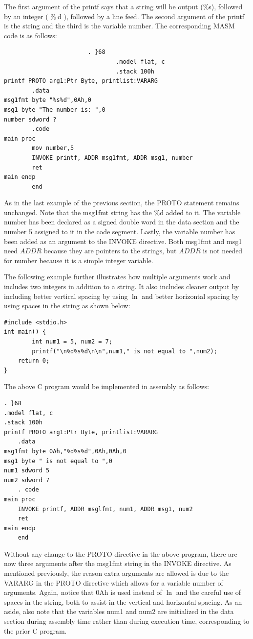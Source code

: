 \documentclass[10pt]{article}
\begin{document}
The first argument of the printf says that a string will be output (\%s), followed by an integer ( $\% \mathrm{~d}$ ), followed by a line feed. The second argument of the printf is the string and the third is the variable number. The corresponding MASM code is as follows:

\begin{verbatim}
                        . }68
                                .model flat, c
                                .stack 100h
printf PROTO arg1:Ptr Byte, printlist:VARARG
        .data
msg1fmt byte "%s%d",0Ah,0
msg1 byte "The number is: ",0
number sdword ?
        .code
main proc
        mov number,5
        INVOKE printf, ADDR msg1fmt, ADDR msg1, number
        ret
main endp
        end
\end{verbatim}

As in the last example of the previous section, the PROTO statement remains unchanged. Note that the msg1fmt string has the \%d added to it. The variable number has been declared as a signed double word in the data section and the number 5 assigned to it in the code segment. Lastly, the variable number has been added as an argument to the INVOKE directive. Both msg1fmt and msg1 need $A D D R$ because they are pointers to the strings, but $A D D R$ is not needed for number because it is a simple integer variable.

The following example further illustrates how multiple arguments work and includes two integers in addition to a string. It also includes cleaner output by including better vertical spacing by using $\ln$ and better horizontal spacing by using spaces in the string as shown below:

\begin{verbatim}
#include <stdio.h>
int main() {
        int num1 = 5, num2 = 7;
        printf("\n%d%s%d\n\n",num1," is not equal to ",num2);
    return 0;
}
\end{verbatim}

The above C program would be implemented in assembly as follows:

\begin{verbatim}
. }68
.model flat, c
.stack 100h
printf PROTO arg1:Ptr Byte, printlist:VARARG
    .data
msg1fmt byte 0Ah,"%d%s%d",0Ah,0Ah,0
msg1 byte " is not equal to ",0
num1 sdword 5
num2 sdword 7
    . code
main proc
    INVOKE printf, ADDR msglfmt, num1, ADDR msg1, num2
    ret
main endp
    end
\end{verbatim}

Without any change to the PROTO directive in the above program, there are now three arguments after the msg1fmt string in the INVOKE directive. As mentioned previously, the reason extra arguments are allowed is due to the VARARG in the PROTO directive which allows for a variable number of arguments. Again, notice that 0Ah is used instead of $\ln$ and the careful use of spaces in the string, both to assist in the vertical and horizontal spacing. As an aside, also note that the variables num1 and num2 are initialized in the data section during assembly time rather than during execution time, corresponding to the prior C program.
\end{document}
